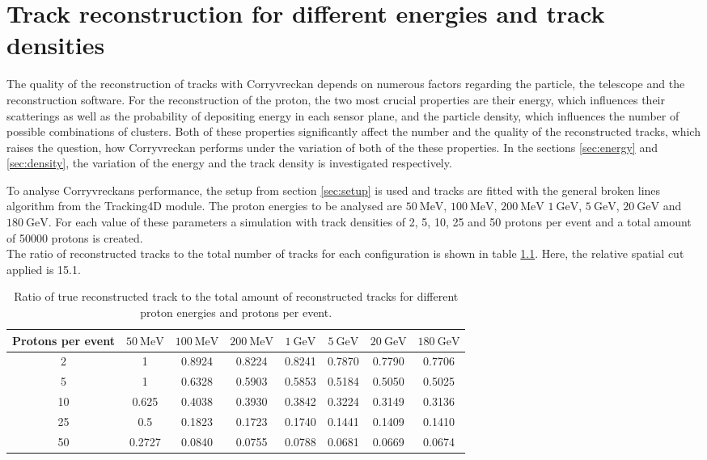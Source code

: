 \chapter{Track reconstruction for different energies and track densities}
The quality of the reconstruction of tracks with Corryvreckan depends on numerous factors regarding the particle, the telescope and the reconstruction software.
For the reconstruction of the proton, the two most crucial properties are their energy, which influences their scatterings as well as the probability of
depositing energy in each sensor plane, and the particle density, which influences the number of possible combinations of clusters.
Both of these properties significantly affect the number and the quality of the reconstructed tracks, which raises the question, how Corryvreckan performs
under the variation of both of the these properties.
In the sections \ref{sec:energy} and \ref{sec:density}, the variation of the energy and the track density is investigated respectively. 

To analyse Corryvreckans performance, the setup from section \ref{sec:setup} is used and tracks are fitted with the general broken lines algorithm from the Tracking4D module.
The proton energies to be analysed are $\SI{50}{\mega\eV}$, $\SI{100}{\mega\eV}$, $\SI{200}{\mega\eV}$
$\SI{1}{\giga\eV}$, $\SI{5}{\giga\eV}$, $\SI{20}{\giga\eV}$ and $\SI{180}{\giga\eV}$. For each value of these parameters a simulation with track densities
of 2, 5, 10, 25 and 50 protons per event and a total amount of 50000 protons is created. \\
The ratio of reconstructed tracks to the total number of tracks for each configuration is shown in table \ref{tab:study}. Here, the relative spatial cut applied is 15.1.


\begin{table}
  \centering
  \begin{tabular}{c | c c c c c c c}
    \toprule
     Protons per event &  $\SI{50}{\mega\eV}$ & $\SI{100}{\mega\eV}$ & $\SI{200}{\mega\eV}$ & $\SI{1}{\giga\eV}$ & $\SI{5}{\giga\eV}$ & $\SI{20}{\giga\eV}$ & $\SI{180}{\giga\eV}$ \\
    \midrule
     2   & 1 & 0.8924 & 0.8224 & 0.8241 & 0.7870 & 0.7790 & 0.7706  \\
     5   & 1 & 0.6328 & 0.5903 & 0.5853 & 0.5184 & 0.5050 & 0.5025  \\
     10  & 0.625 & 0.4038 & 0.3930 & 0.3842 & 0.3224 & 0.3149 & 0.3136  \\
     25  & 0.5 & 0.1823 & 0.1723 & 0.1740 & 0.1441 & 0.1409 & 0.1410  \\
     50  & 0.2727 & 0.0840 & 0.0755 & 0.0788 & 0.0681 & 0.0669 & 0.0674  \\
  \end{tabular}
  \caption{Ratio of true reconstructed track to the total amount of reconstructed tracks for different proton energies and protons per event.}
  \label{tab:study}
\end{table}

